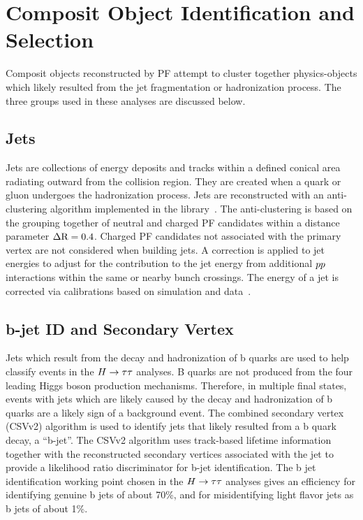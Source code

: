 \section{Composit Object Identification and Selection}
Composit objects reconstructed by PF attempt to cluster together physics-objects which likely
resulted from the jet fragmentation or hadronization process. The three groups used in these
analyses are discussed below.

 
\subsection{Jets}
Jets are collections of energy deposits and tracks within a defined conical area radiating outward
from the collision region. They are created when a quark or gluon undergoes the hadronization process.
Jets are reconstructed with an anti-\kt clustering algorithm implemented in the \FASTJET 
library~\cite{Cacciari:2008gp, Cacciari:2011ma, Cacciari:fastjet2}. The anti-\kt clustering is based on the grouping
together of neutral and charged PF candidates within a distance parameter $\Delta \mathrm{R} = 0.4$. Charged PF 
candidates not associated with the primary vertex are not considered when building jets.
A correction is applied to jet energies to adjust for the contribution to the jet energy from 
additional $pp$ interactions within the same or nearby bunch crossings. The energy of a jet is 
corrected via calibrations based on simulation and data~\cite{CMS-JME-10-011}.


\subsection{b-jet ID and Secondary Vertex}
Jets which result from the decay and hadronization of b quarks are used to help classify events
in the $H\to\tau\tau$ analyses. B quarks are not produced from the four leading Higgs boson production
mechanisms. Therefore, in multiple final states, events with jets which are likely caused by the decay and
hadronization of b quarks are a likely sign of a background event.
The combined secondary vertex (CSVv2) algorithm is used to identify jets that likely resulted
from a b quark decay, a ``b-jet''. The CSVv2 algorithm uses track-based lifetime information together with 
the reconstructed secondary vertices associated with the jet to provide a likelihood ratio 
discriminator for b-jet identification. The b jet identification working point chosen in the $H\to\tau\tau$ analyses 
gives an efficiency for identifying genuine b jets of about 70\%, and for misidentifying light flavor jets
as b jets of about 1\%.


